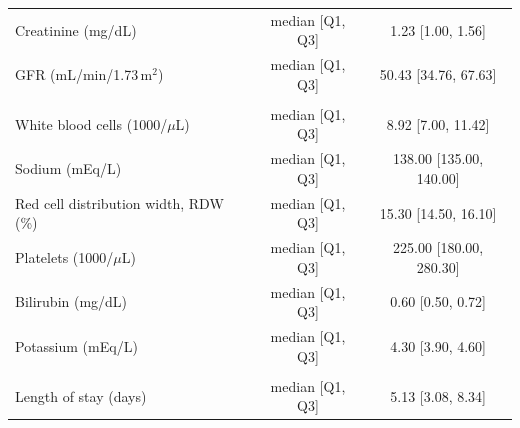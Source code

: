 \documentclass[11pt,a4paper]{article}
\begin{document}
\begin{table}[H]
\begin{tabular}{lcc}
Creatinine (mg/dL)                   & median [Q1, Q3] & 1.23 [1.00, 1.56] \\
GFR (mL/min/1.73\,m$^2$)             & median [Q1, Q3] & 50.43 [34.76, 67.63] \\
\addlinespace
\multicolumn{3}{l}{\itshape Other laboratory values} \\
White blood cells (1000/$\mu$L)      & median [Q1, Q3] & 8.92 [7.00, 11.42] \\
Sodium (mEq/L)                       & median [Q1, Q3] & 138.00 [135.00, 140.00] \\
Red cell distribution width, RDW (\%)& median [Q1, Q3] & 15.30 [14.50, 16.10] \\
Platelets (1000/$\mu$L)              & median [Q1, Q3] & 225.00 [180.00, 280.30] \\
Bilirubin (mg/dL)                    & median [Q1, Q3] & 0.60 [0.50, 0.72] \\
Potassium (mEq/L)                    & median [Q1, Q3] & 4.30 [3.90, 4.60] \\
\addlinespace
\multicolumn{3}{l}{\itshape Hospitalisation} \\
Length of stay (days)                & median [Q1, Q3] & 5.13 [3.08, 8.34] \\
\bottomrule
\end{tabular}
\end{table}
\end{document}
